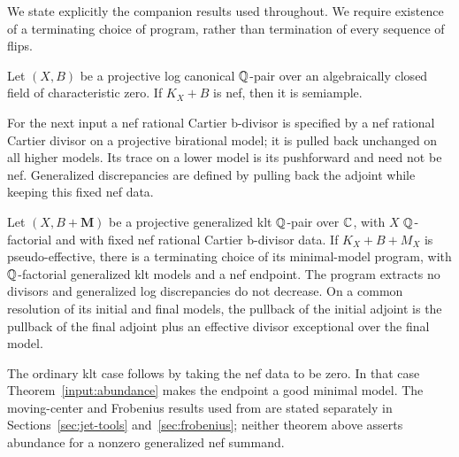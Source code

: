We state explicitly the companion results used throughout. We require
existence of a terminating choice of program, rather than termination
of every sequence of flips.

\begin{theorem}
\label{input:abundance}
Let $(X,B)$ be a projective log canonical $\mathbb Q$-pair over an
algebraically closed field of characteristic zero. If $K_X+B$ is nef,
then it is semiample.
\end{theorem}

For the next input a nef rational Cartier b-divisor is specified by a
nef rational Cartier divisor on a projective birational model; it is
pulled back unchanged on all higher models. Its trace on a lower model
is its pushforward and need not be nef. Generalized discrepancies are
defined by pulling back the adjoint while keeping this fixed nef data.

\begin{theorem}
\label{input:models}
Let $(X,B+\mathbf M)$ be a projective generalized klt $\mathbb Q$-pair over $\mathbb C$,
with $X$ $\mathbb Q$-factorial and with fixed nef rational Cartier b-divisor
data. If $K_X+B+M_X$ is pseudo-effective, there is a terminating choice
of its minimal-model program, with $\mathbb Q$-factorial generalized klt
models and a nef endpoint. The program extracts no divisors and
generalized log discrepancies do not decrease. On a common resolution
of its initial and final models, the pullback of the initial adjoint
is the pullback of the final adjoint plus an effective divisor
exceptional over the final model.
\end{theorem}

The ordinary klt case follows by taking the nef data to be zero. In
that case Theorem~\ref{input:abundance} makes the endpoint a good
minimal model. The moving-center and Frobenius results used from
\cite{LA} are stated separately in
Sections~\ref{sec:jet-tools} and~\ref{sec:frobenius}; neither theorem
above asserts abundance for a nonzero generalized nef summand.
